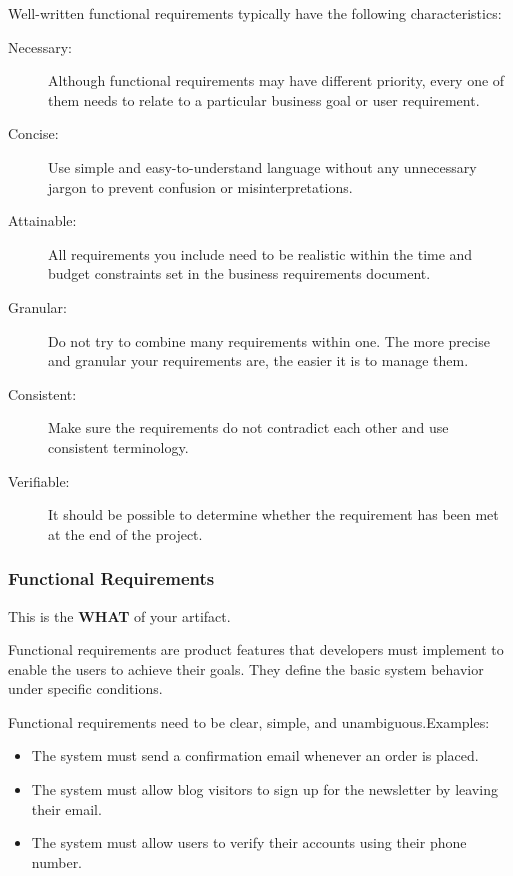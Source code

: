 Well-written functional requirements typically have the following characteristics:
\begin{description}



    \item[Necessary:] Although functional requirements may have different priority, every one of them needs to relate to a particular business goal or user requirement.

  \item[Concise:] Use simple and easy-to-understand language without any unnecessary jargon to prevent confusion or misinterpretations.

 \item[Attainable:] All requirements you include need to be realistic within the time and budget constraints set in the business requirements document.

 \item[Granular:] Do not try to combine many requirements within one. The more precise and granular your requirements are, the easier it is to manage them.

 \item[Consistent:] Make sure the requirements do not contradict each other and use consistent terminology.

 \item[Verifiable:] It should be possible to determine whether the requirement has been met at the end of the project.
    \end{description}

\subsubsection{Functional Requirements}
This is the \textbf{WHAT} of your artifact.

Functional requirements are product features that developers must implement to enable the users to achieve their goals. They define the basic system behavior under specific conditions. 

Functional requirements need to be clear, simple, and unambiguous.Examples:
\begin{itemize}
    \item The system must send a confirmation email whenever an order is placed.

      \item The system must allow blog visitors to sign up for the newsletter by leaving their email.

      \item The system must allow users to verify their accounts using their phone number.
\end{itemize}


